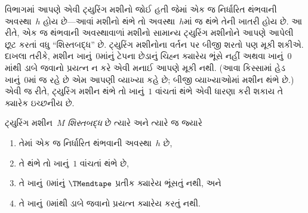 \documentclass[../../../include/open-logic-section]{subfiles}
\begin{document}

\begin{explain}
 વિભાગમાં આપણે એવી ટ્યુરિંગ મશીનો
જોઈ હતી જેમાં એક જ નિર્ધારિત થંભવાની અવસ્થા~$h$
હોય છે---આવાં મશીનો થંભે તો અવસ્થા~$h$માં જ થંભે
તેની ખાતરી હોય છે. આ રીતે, એક જ થંભવાની અવસ્થાવાળાં
મશીનો સામાન્ય ટ્યુરિંગ મશીનોને આપણે આપેલી છૂટ કરતાં
વધુ ``શિસ્તબદ્ધ'' છે. ટ્યુરિંગ મશીનોના વર્તન પર બીજી
શરતો પણ મૂકી શકીએ. દાખલા તરીકે, મશીન ખાનું~$0$માંનું
ટેપના છેડાનું ચિહ્ન ક્યારેય ભૂંસે નહીં અથવા ખાનું~$0$માંથી
ડાબે જવાનો પ્રયત્ન ન કરે એવી મનાઈ આપણે મૂકી નથી.
(આવા કિસ્સામાં હેડ ખાનું~$0$માં જ રહે છે એમ આપણી
વ્યાખ્યા કહે છે; બીજી વ્યાખ્યાઓમાં મશીન થંભે છે.)
એવી જ રીતે, ટ્યુરિંગ મશીન થંભે તો ખાનું~$1$ વાંચતાં
થંભે એવી ધારણા કરી શકાય તે ક્યારેક ઇચ્છનીય છે.
\end{explain}

\begin{defn}
ટ્યુરિંગ મશીન~$M$ \emph{શિસ્તબદ્ધ} છે ત્યારે અને
ત્યારે જ જ્યારે
\begin{enumerate}
    \item તેમાં એક જ નિર્ધારિત થંભવાની અવસ્થા~$h$ છે,
    \item તે થંભે તો ખાનું~$1$ વાંચતાં થંભે છે,
    \item તે ખાનું~$0$માંનું $\TMendtape$ પ્રતીક ક્યારેય
    ભૂંસતું નથી, અને
    \item તે ખાનું~$0$માંથી ડાબે જવાનો પ્રયત્ન ક્યારેય
    કરતું નથી.
\end{enumerate}
\end{defn}
\end{document}
